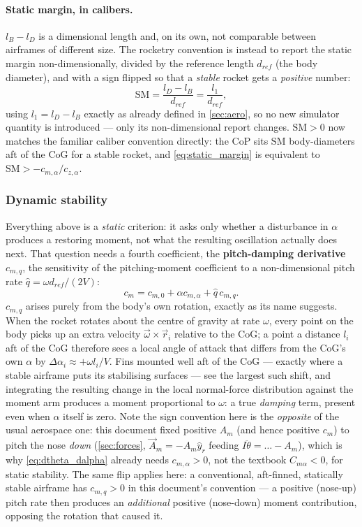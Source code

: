 \paragraph{Static margin, in calibers.} $l_B-l_D$ is a dimensional length and, on its own, not
comparable between airframes of different size. The rocketry convention is instead to report the
static margin non-dimensionally, divided by the reference length $d_{ref}$ (the body diameter),
and with a sign flipped so that a \emph{stable} rocket gets a \emph{positive} number:
\begin{equation}
    \mathrm{SM} = \frac{l_D-l_B}{d_{ref}} = \frac{l_1}{d_{ref}},
\end{equation}
using $l_1=l_D-l_B$ exactly as already defined in \autoref{sec:aero}, so no new simulator quantity
is introduced --- only its non-dimensional report changes. $\mathrm{SM}>0$ now matches the
familiar caliber convention directly: the CoP sits $\mathrm{SM}$ body-diameters aft of the CoG for
a stable rocket, and \autoref{eq:static_margin} is equivalent to
$\mathrm{SM}>-c_{m,\alpha}/c_{z,\alpha}$.

\subsubsection{Dynamic stability}\label{sec:analysis_dynamic}
Everything above is a \emph{static} criterion: it asks only whether a disturbance in $\alpha$
produces a restoring moment, not what the resulting oscillation actually does next. That question
needs a fourth coefficient, the \textbf{pitch-damping derivative} $c_{m,q}$, the sensitivity of the
pitching-moment coefficient to a non-dimensional pitch rate $\hat{q}=\omega d_{ref}/(2V)$:
\begin{equation}
    c_m = c_{m,0} + \alpha c_{m,\alpha} + \hat{q}\,c_{m,q}.
\end{equation}
$c_{m,q}$ arises purely from the body's own rotation, exactly as its name suggests. When the
rocket rotates about the centre of gravity at rate $\omega$, every point on the body picks up an
extra velocity $\vec{\omega}\times\vec{r}_i$ relative to the CoG; a point a distance $l_i$ aft of
the CoG therefore sees a local angle of attack that differs from the CoG's own $\alpha$ by
$\Delta\alpha_i\approx+\omega l_i/V$. Fins mounted well aft of the CoG --- exactly where a stable
airframe puts its stabilising surfaces --- see the largest such shift, and integrating the
resulting change in the local normal-force distribution against the moment arm produces a moment
proportional to $\omega$: a true \emph{damping} term, present even when $\alpha$ itself is zero.
Note the sign convention here is the \emph{opposite} of the usual aerospace one: this document
fixed positive $A_m$ (and hence positive $c_m$) to pitch the nose \emph{down}
(\autoref{sec:forces}, $\vec{A}_m=-A_m\hat{y}_r$ feeding $I\ddot\theta=\dots-A_m$), which is why
\autoref{eq:dtheta_dalpha} already needs $c_{m,\alpha}>0$, not the textbook $C_{m\alpha}<0$, for
static stability. The same flip applies here: a conventional, aft-finned, statically stable
airframe has $c_{m,q}>0$ in this document's convention --- a positive (nose-up) pitch rate then
produces an \emph{additional} positive (nose-down) moment contribution, opposing the rotation that
caused it.

